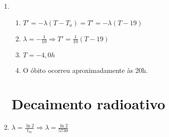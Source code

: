 \documentclass[a4paper]{article}
\begin{document}
\begin{enumerate}
\item 
  \begin{enumerate}
  \item $T' = -\lambda (T-T_a) = T' = -\lambda(T-19)$
  \item $\lambda = -\frac{1}{10} \Rightarrow T' = \frac{1}{10}(T-19)$
  \item $T= -4,0h$
  \item O óbito ocorreu aproximadamente às 20h.
  \end{enumerate}



\section{Decaimento radioativo}


\item $\lambda = \frac{\ln 2}{t_m} \Rightarrow \lambda = \frac{\ln 2}{5730}$




\end{enumerate}
\end{document}
